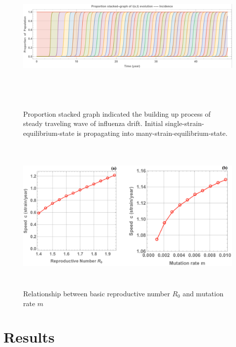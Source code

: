 \documentclass[preprint,12pt]{elsarticle}
\begin{document}
\begin{figure}
  \centering
  \includegraphics[width=6in,height=3in]{figures/Proportion}
  \caption{Proportion stacked graph indicated the building up process of steady traveling wave of influenza drift.
  Initial single-strain-equilibrium-state is propagating into many-strain-equilibrium-state.}
\label{fig:Proportion}
\end{figure}


\begin{figure}
  \centering
  \includegraphics[width=6in,height=3in]{figures/SpeedRM}
  \caption{Relationship between basic reproductive number \(R_0\) and mutation rate \(m\)}
  \label{fig:SpeedRM}
\end{figure}


\newpage
\section{Results}
\end{document}
